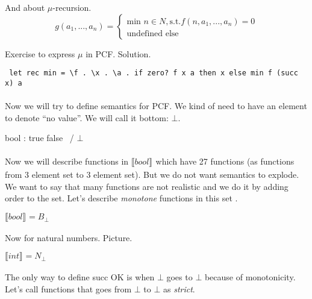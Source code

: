 \documentclass[a4paper,10pt]{book}
\newcommand{\sem}[2]{ \llbracket#1\rrbracket_{#2} }
\begin{document}

And about $\mu$-recursion.
 \[
    g(a_1,...,a_n)=\left\{
                \begin{array}{ll}
                  \text{min } n\in N, \text{s.t.} f(n,a_1,...,a_n)=0\\
                  \text{undefined else}
                \end{array}
              \right.
  \]
  
  
  

Exercise to express $\mu$ in PCF.
Solution.
\begin{verbatim}
 let rec min = \f . \x . \a . if zero? f x a then x else min f (succ x) a
\end{verbatim}

\paragraph{}
Now we will try to define semantics for PCF.
We kind of need to have an element to denote ``no value''. We will call it bottom: $\bot$.

bool :   true  false
           \    /
            $\bot$
            
\paragraph{}
Now we will describe functions in $\sem{bool}{}$ which have 27 functions (as functions from 3
element set to 3 element set). But we do not want semantics to explode. We want to say that 
many functions are not realistic and we do it by adding order to the set. Let's describe 
\textit{monotone} functions in this set .


$\sem{bool}{} = B_\bot$

Now for natural numbers. Picture.

$\sem{int}{} = N_\bot$ 

The only way to define succ OK is when $\bot$ goes to $\bot$ because of monotonicity. Let's call
functions that goes from $\bot$ to $\bot$ as \textit{strict}.
\end{document}
